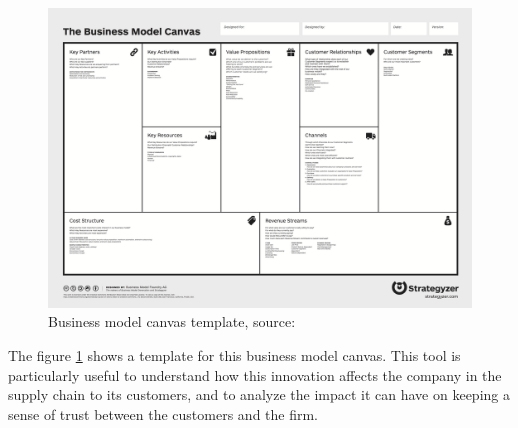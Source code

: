 \begin{figure}
  \centering
  \includegraphics[width=.8\textwidth]{images/Business_Model_Canvas.png}
  \caption{Business model canvas template, source:
    \cite{site:bmcanvas}}
  \label{fig:bmcanvas}
\end{figure}

The figure \ref{fig:bmcanvas} shows a template for this business model
canvas. This tool is particularly useful to understand how this
innovation affects the company in the supply chain to its customers,
and to analyze the impact it can have on keeping a sense of trust
between the customers and the firm.
